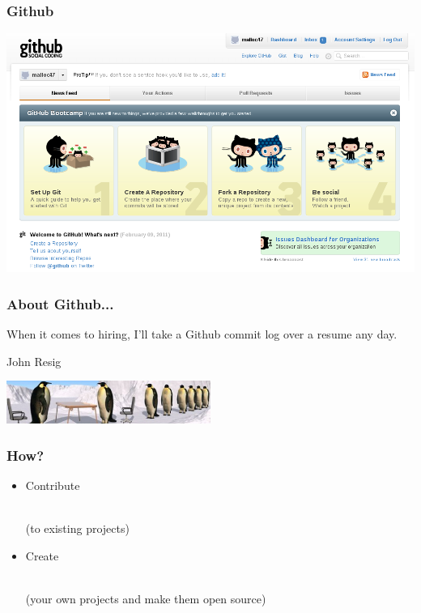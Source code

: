 \documentclass{beamer}
\begin{document}
\begin{frame}
  \frametitle{Github}
  \begin{center} \includegraphics[width=1\textwidth]{../img/github-screenshot} \end{center}
\end{frame}

\begin{frame}
  \frametitle{About Github...}
    \begin{Large}
      When it comes to hiring, I'll take a Github commit log over a
      resume any day.
      \begin{flushright}
        \textemdash{}John Resig
      \end{flushright}
  \begin{center} \includegraphics[width=0.5\textwidth]{../img/tux-interview} \end{center}
    \end{Large}
\end{frame}

\begin{frame}
  \frametitle{How?}
  \begin{itemize}
    \setlength{\itemsep}{2em}
  \item \begin{LARGE} Contribute \end{LARGE} \\ (to existing projects)
  \item \begin{LARGE} Create \end{LARGE} \\ (your own projects and make them open source)
  \end{itemize}
\end{frame}
\end{document}
